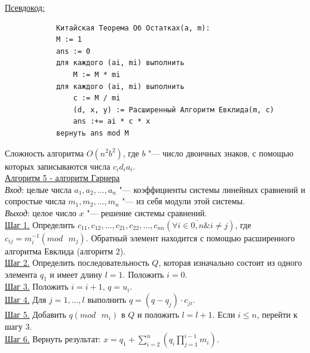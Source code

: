 \documentclass[bachelor, och, labwork]{SCWorks}
\begin{document}
            \underline{Псевдокод:}
            \begin{verbatim}
            Китайская Теорема Об Остатках(a, m):
            M := 1
            ans := 0
            для каждого (ai, mi) выполнить
                M := M * mi
            для каждого (ai, mi) выполнить
                c := M / mi
                (d, x, y) := Расширенный Алгоритм Евклида(m, c)
                ans :+= ai * c * x
            вернуть ans mod M
            \end{verbatim}

            Сложность алгоритма $O(n^2 b^2)$, где $b$ "--- число двоичных
            знаков, с помощью которых записываются числа $c_i d_i a_i$.\\

        \underline{Алгоритм 5 - алгоритм Гарнера}\\
            \textit{Вход}: целые числа $a_1, a_2, \dots, a_n$ "--- коэффициенты
            системы линейных сравнений и сопростые числа $m_1, m_2,
            \dots, m_n$ "--- из себя модули этой системы.\\
            \textit{Выход}: целое число $x$ "--- решение системы сравнений.\\
            \underline{Шаг 1.} Определить $c_{11}, c_{12}, \dots, c_{21},
            c_{22}, \dots, c_{nn} (\forall i \in \overline{0,n} \& i \neq j)$, где $c_{ij} = m^{-1}_i (mod \text{ } m_j)$. Обратный элемент находится с помощью
            расширенного алгоритма Евклида (алгоритм $2$).\\
            \underline{Шаг 2.} Определить последовательность $Q$, которая
            изначально состоит из одного элемента $q_1$ и имеет длину $l = 1$.
            Положить $i = 0$. \\
            \underline{Шаг 3.} Положить $i = i + 1$, $q = u_i$.\\
            \underline{Шаг 4.} Для $j = 1, \dots, l$ выполнить $q = (q -
            q_j) \cdot c_{ji}$.\\
            \underline{Шаг 5.} Добавить $q (mod \text{ } m_i)$ в $Q$ и положить
            $l = l + 1$. Если $i \leq n$, перейти к шагу 3.\\
            \underline{Шаг 6.} Вернуть результат: $x = q_1 + \sum_{i =
            2}^{n} (q_i \prod_{j = 1}^{i - 1} m_i)$.
\end{document}

